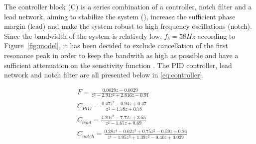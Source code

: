 The controller block (C) is a series combination of a \abbrPID controller, notch filter and a lead network, aiming to stabilize the system (\abbrPID), increase the sufficient phase margin (lead) and make the system robust to high frequency oscillations (notch). Since the bandwidth of the system is relatively low, $f_b = 58 Hz$ according to  Figure~\ref{fig:model}, it has been decided to exclude cancellation of the first resonance peak in order to keep the bandwith as high as possible and have a sufficient attenuation on the sensitivity function \citep{ButcherController:2015}. The PID controller, lead network and notch filter are all presented below in \eqref{eq:controller}.

\begin{subequations}
  \label{eq:controller}
\begin{alignat}{2}
  \label{eq:pre}
  & F = \frac{0.0029z - 0.0029}{z^3 - 2.91z^2 + 2.816 z - 0.91} \\
  \label{eq:pid}
  & C_{PID} = \frac{0.47z^2 - 0.94z + 0.47}{z^2 - 1.78 z + 0.78} \\
  \label{eq:lead}
  & C_{lead} = \frac{4.20 z^2 - 7.72z + 3.55}{z^2 - 1.67z + 0.69} \\
  \label{eq:notch}
  & C_{notch} = \frac{0.28z^4 - 0.62z^3 + 0.75z^2 - 0.59z + 0.26}{z^4 - 1.95z^3 + 1.39z^2 - 0.40z + 0.039}
\end{alignat}
\end{subequations}
